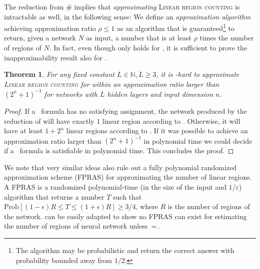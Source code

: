 \documentclass{article}
\newtheorem{theorem}{Theorem}[section]
\begin{document}
The reduction from \#\SAT{} implies that \emph{approximating} \textsc{Linear region counting} is intractable as well, in the following sense: We define an \emph{approximation algorithm} achieving approximation ratio $\rho \leq 1$ as an algorithm that is guaranteed\footnote{The algorithm may be probabilistic and return the correct answer with probability bounded away from $1/2$.} to return, given a network $N$ as input, a number that is at least $\rho$ times the number of regions of $N$. In fact, even though  only holds for , it is sufficient to prove the inapproximability result also for .
\begin{theorem}
\label{exponential_hardness_of_approximation_result}
    For any fixed constant $L\in \mathbb{N}, L\geq 3$, it is \NP-hard to approximate \textsc{Linear region counting} for  within an approximation ratio larger than $(2^n+1)^{-1}$ for networks with $L$ hidden layers and input dimension $n$.
\end{theorem}
\begin{proof}
If a \SAT\ formula has no satisfying assignment, the network produced by the reduction of  will have exactly $1$ linear region according to . Otherwise, it will have at least $1+2^n$ linear regions according to . If it was possible to achieve an approximation ratio larger than $(2^n+1)^{-1}$ in polynomial time we could decide if a \SAT\ formula is satisfiable in polynomial time. This concludes the proof.   
\end{proof}
We note that very similar ideas also rule out a fully polynomial randomized approximation scheme (FPRAS) for approximating the number of linear regions. A FPRAS \citep{jerrum2003counting} is a randomized polynomial-time (in the size of the input and $1/\varepsilon$) algorithm that returns a number $T$ such that $\text{Prob}[(1-\epsilon)R  \leq T\leq (1+\epsilon)R]\geq 3/4$,
where $R$ is the number of regions of the network.  can be easily adapted to show no FPRAS can exist for estimating the number of regions of neural network unless \NP\,=\,\RP.
\end{document}
